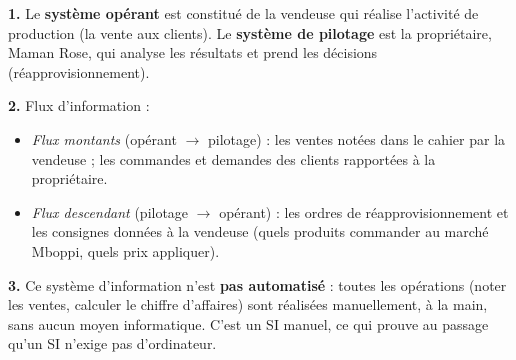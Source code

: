 \documentclass[11pt]{article}
\begin{document}
\begin{corrige}
\textbf{1.} Le \textbf{système opérant} est constitué de la vendeuse qui réalise l'activité de production (la vente aux clients). Le \textbf{système de pilotage} est la propriétaire, Maman Rose, qui analyse les résultats et prend les décisions (réapprovisionnement).

\textbf{2.} Flux d'information :
\begin{itemize}
\item \emph{Flux montants} (opérant $\rightarrow$ pilotage) : les ventes notées dans le cahier par la vendeuse ; les commandes et demandes des clients rapportées à la propriétaire.
\item \emph{Flux descendant} (pilotage $\rightarrow$ opérant) : les ordres de réapprovisionnement et les consignes données à la vendeuse (quels produits commander au marché Mboppi, quels prix appliquer).
\end{itemize}

\textbf{3.} Ce système d'information n'est \textbf{pas automatisé} : toutes les opérations (noter les ventes, calculer le chiffre d'affaires) sont réalisées manuellement, à la main, sans aucun moyen informatique. C'est un SI manuel, ce qui prouve au passage qu'un SI n'exige pas d'ordinateur.
\end{corrige}
\end{document}
